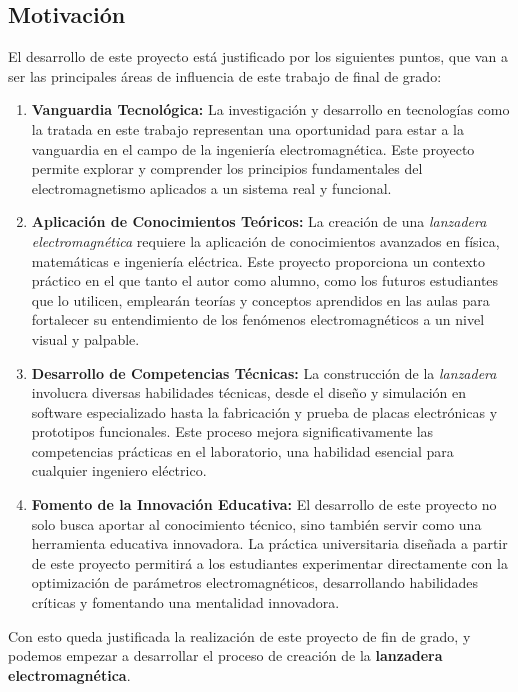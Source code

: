 \newpage
\subsection{Motivación}

El desarrollo de este proyecto está justificado por los siguientes puntos, que van a ser las principales áreas de influencia de este trabajo de final de grado:

\begin{enumerate}
    \item \textbf{Vanguardia Tecnológica:} La investigación y desarrollo en tecnologías como la tratada en este trabajo representan una oportunidad para estar a la vanguardia en el campo de la ingeniería electromagnética. Este proyecto permite explorar y comprender los principios fundamentales del electromagnetismo aplicados a un sistema real y funcional.
    \item \textbf{Aplicación de Conocimientos Teóricos:} La creación de una \textit{lanzadera electromagnética} requiere la aplicación de conocimientos avanzados en física, matemáticas e ingeniería eléctrica. Este proyecto proporciona un contexto práctico en el que tanto el autor como alumno, como los futuros estudiantes que lo utilicen, emplearán teorías y conceptos aprendidos en las aulas para fortalecer su entendimiento de los fenómenos electromagnéticos a un nivel visual y palpable.
    \item \textbf{Desarrollo de Competencias Técnicas:} La construcción de la \textit{lanzadera} involucra diversas habilidades técnicas, desde el diseño y simulación en software especializado hasta la fabricación y prueba de placas electrónicas y prototipos funcionales. Este proceso mejora significativamente las competencias prácticas en el laboratorio, una habilidad esencial para cualquier ingeniero eléctrico.
    \item \textbf{Fomento de la Innovación Educativa:} El desarrollo de este proyecto no solo busca aportar al conocimiento técnico, sino también servir como una herramienta educativa innovadora. La práctica universitaria diseñada a partir de este proyecto permitirá a los estudiantes experimentar directamente con la optimización de parámetros electromagnéticos, desarrollando habilidades críticas y fomentando una mentalidad innovadora.
\end{enumerate}

Con esto queda justificada la realización de este proyecto de fin de grado, y podemos empezar a desarrollar el proceso de creación de la \textbf{lanzadera electromagnética}.